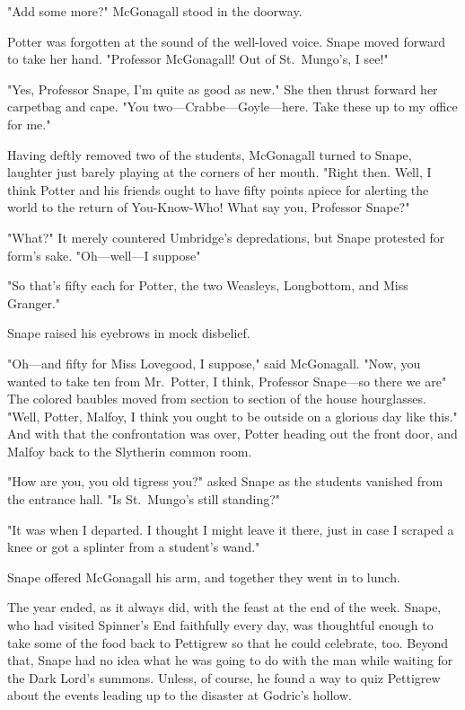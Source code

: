 "Add some more?" McGonagall stood in the doorway.

Potter was forgotten at the sound of the well-loved voice. Snape moved forward to take her hand. "Professor McGonagall! Out of St.~Mungo's, I see!"

"Yes, Professor Snape, I'm quite as good as new." She then thrust forward her carpetbag and cape. "You two—Crabbe—Goyle—here. Take these up to my office for me."

Having deftly removed two of the students, McGonagall turned to Snape, laughter just barely playing at the corners of her mouth. "Right then. Well, I think Potter and his friends ought to have fifty points apiece for alerting the world to the return of{\el} You-Know-Who! What say you, Professor Snape?"

"What?" It merely countered Umbridge's depredations, but Snape protested for form's sake. "Oh—well—I suppose{\el}"

"So that's fifty each for Potter, the two Weasleys, Longbottom, and Miss Granger."

Snape raised his eyebrows in mock disbelief.

"Oh—and fifty for Miss Lovegood, I suppose," said McGonagall. "Now, you wanted to take ten from Mr.~Potter, I think, Professor Snape—so there we are{\el}" The colored baubles moved from section to section of the house hourglasses. "Well, Potter, Malfoy, I think you ought to be outside on a glorious day like this." And with that the confrontation was over, Potter heading out the front door, and Malfoy back to the Slytherin common room.

"How are you, you old tigress you?" asked Snape as the students vanished from the entrance hall. "Is St.~Mungo's still standing?"

"It was when I departed. I thought I might leave it there, just in case I scraped a knee or got a splinter from a student's wand."

Snape offered McGonagall his arm, and together they went in to lunch.

The year ended, as it always did, with the feast at the end of the week. Snape, who had visited Spinner's End faithfully every day, was thoughtful enough to take some of the food back to Pettigrew so that he could celebrate, too. Beyond that, Snape had no idea what he was going to do with the man while waiting for the Dark Lord's summons. Unless, of course, he found a way to quiz Pettigrew about the events leading up to the disaster at Godric's hollow.

